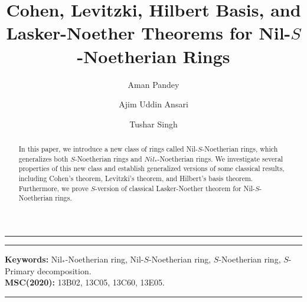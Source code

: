 \documentclass[11pt]{article}
\begin{document}
	\newtheorem{theorem}{Theorem}[section]
	\newtheorem{question}{Question}[section]
	\newtheorem{thm}[theorem]{Theorem}
	\newtheorem{lem}[theorem]{Lemma}
	\newtheorem{eg}[theorem]{Example}
	\newtheorem{prop}[theorem]{Proposition}
	\newtheorem{cor}[theorem]{Corollary}
	\newtheorem{rem}[theorem]{Remark}
	\newtheorem{deff}[theorem]{Definition}
	
	\title{Cohen, Levitzki, Hilbert Basis, and Lasker-Noether Theorems for Nil-$S$-Noetherian Rings}
	
	\author[1]{Aman Pandey}
	\author[2]{Ajim Uddin Ansari}
	\author[3]{Tushar Singh}
	
	
	\vskip0.05in
	\date{}
\maketitle
	\hrule
	\maketitle
	\hrule
	
\begin{abstract}
\noindent

In this paper, we introduce a new class of rings called Nil-$S$-Noetherian rings, which generalizes both $S$-Noetherian rings and $Nil_{*}$-Noetherian rings. We investigate several properties of this new class and establish generalized versions of some classical results, including Cohen's theorem, Levitzki's theorem, and Hilbert's basis theorem. Furthermore, we prove $S$-version of  classical Lasker-Noether theorem for Nil-$S$-Noetherian rings.
\end{abstract}

	\textbf{Keywords:} Nil$_{*}$-Noetherian ring, Nil-$S$-Noetherian ring, $S$-Noetherian ring, $S$-Primary decomposition. \\
	\textbf{MSC(2020):} 13B02, 13C05, 13C60, 13E05.
	\hrule
	
\end{document}
